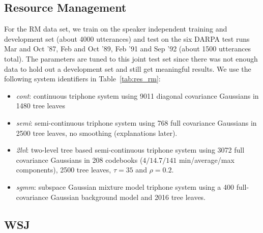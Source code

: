 \documentclass{article}
\begin{document}
\subsection{Resource Management}
For the RM data set, we train on the speaker independent training and development 
set (about 4000 utterances) and test on the six DARPA test runs Mar and Oct '87,
Feb and Oct '89, Feb '91 and Sep '92 (about 1500 utterances total).  The parameters 
are tuned to this joint test set since there was not enough data to hold out a
development set and still get meaningful results.
We use the following system identifiers in Table~\ref{tab:res_rm}:
%
\begin{itemize}
\item
  {\em cont}: continuous triphone system using 9011 diagonal covariance
  Gaussians in 1480 tree leaves
\item
  {\em semi}: semi-continuous triphone system using 768 full covariance
  Gaussians in 2500 tree leaves, no smoothing (explanations later).
\item
  {\em 2lvl}: two-level tree based semi-continuous triphone system using
  3072 full covariance Gaussians in 208 codebooks ($4/14.7/141$ min/average/max
  components), 2500 tree leaves, $\tau = 35$ and $\rho = 0.2$.
\item
  {\em sgmm}: subspace Gaussian mixture model triphone system using a 400 
  full-covariance Gaussian background model and 2016 tree leaves.
\end{itemize}

\subsection{WSJ}
\end{document}
